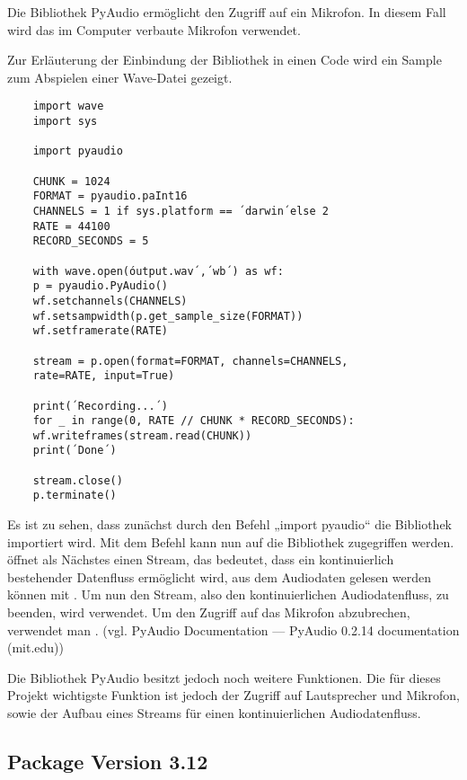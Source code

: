 Die Bibliothek PyAudio ermöglicht den Zugriff auf ein Mikrofon. In diesem Fall wird das im Computer verbaute Mikrofon verwendet.  

Zur Erläuterung der Einbindung der Bibliothek in einen Code wird ein Sample zum Abspielen einer Wave-Datei gezeigt. 

\begin{verbatim}
    import wave
    import sys
    
    import pyaudio
    
    CHUNK = 1024
    FORMAT = pyaudio.paInt16
    CHANNELS = 1 if sys.platform == ´darwin´else 2
    RATE = 44100
    RECORD_SECONDS = 5
    
    with wave.open(óutput.wav´,´wb´) as wf:
    p = pyaudio.PyAudio()
    wf.setchannels(CHANNELS)
    wf.setsampwidth(p.get_sample_size(FORMAT))
    wf.setframerate(RATE)
    
    stream = p.open(format=FORMAT, channels=CHANNELS, 
    rate=RATE, input=True)
    
    print(´Recording...´)
    for _ in range(0, RATE // CHUNK * RECORD_SECONDS):
    wf.writeframes(stream.read(CHUNK))
    print(´Done´)
    
    stream.close()
    p.terminate()
\end{verbatim}

Es ist zu sehen, dass zunächst durch den Befehl „import pyaudio“ die Bibliothek importiert wird. 
Mit dem Befehl  kann nun auf die Bibliothek zugegriffen werden.
 öffnet als Nächstes einen Stream, das bedeutet, dass ein kontinuierlich bestehender Datenfluss ermöglicht wird, aus dem Audiodaten gelesen werden können mit .
Um nun den Stream, also den kontinuierlichen Audiodatenfluss, zu beenden, wird  verwendet. Um den Zugriff auf das Mikrofon abzubrechen, verwendet man .
(vgl. PyAudio Documentation — PyAudio 0.2.14 documentation (mit.edu)) 

Die Bibliothek PyAudio besitzt jedoch noch weitere Funktionen. Die für dieses Projekt wichtigste Funktion ist jedoch der Zugriff auf Lautsprecher und Mikrofon, sowie der Aufbau eines Streams für einen kontinuierlichen Audiodatenfluss. \cite{Pham:2006}

\subsection{Package  Version 3.12}

